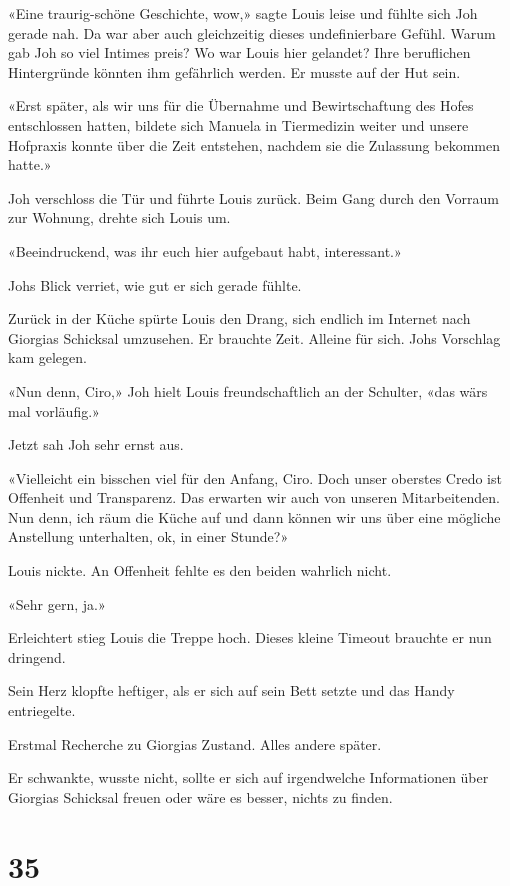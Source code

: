 «Eine traurig-schöne Geschichte, wow,» sagte Louis leise und fühlte sich
Joh gerade nah. Da war aber auch gleichzeitig dieses undefinierbare
Gefühl. Warum gab Joh so viel Intimes preis? Wo war Louis hier gelandet?
Ihre beruflichen Hintergründe könnten ihm gefährlich werden. Er musste
auf der Hut sein.

«Erst später, als wir uns für die Übernahme und Bewirtschaftung des
Hofes entschlossen hatten, bildete sich Manuela in Tiermedizin weiter
und unsere Hofpraxis konnte über die Zeit entstehen, nachdem sie die
Zulassung bekommen hatte.»

Joh verschloss die Tür und führte Louis zurück. Beim Gang durch den
Vorraum zur Wohnung, drehte sich Louis um.

«Beeindruckend, was ihr euch hier aufgebaut habt, interessant.»

Johs Blick verriet, wie gut er sich gerade fühlte.

Zurück in der Küche spürte Louis den Drang, sich endlich im Internet
nach Giorgias Schicksal umzusehen. Er brauchte Zeit. Alleine für sich.
Johs Vorschlag kam gelegen.

«Nun denn, Ciro,» Joh hielt Louis freundschaftlich an der Schulter, «das
wärs mal vorläufig.»

Jetzt sah Joh sehr ernst aus.

«Vielleicht ein bisschen viel für den Anfang, Ciro. Doch unser oberstes
Credo ist Offenheit und Transparenz. Das erwarten wir auch von unseren
Mitarbeitenden. Nun denn, ich räum die Küche auf und dann können wir uns
über eine mögliche Anstellung unterhalten, ok, in einer Stunde?»

Louis nickte. An Offenheit fehlte es den beiden wahrlich nicht.

«Sehr gern, ja.»

Erleichtert stieg Louis die Treppe hoch. Dieses kleine Timeout brauchte
er nun dringend.

Sein Herz klopfte heftiger, als er sich auf sein Bett setzte und das
Handy entriegelte.

Erstmal Recherche zu Giorgias Zustand. Alles andere später.

Er schwankte, wusste nicht, sollte er sich auf irgendwelche
Informationen über Giorgias Schicksal freuen oder wäre es besser, nichts
zu finden.

\chapter{35}\label{section-34}

